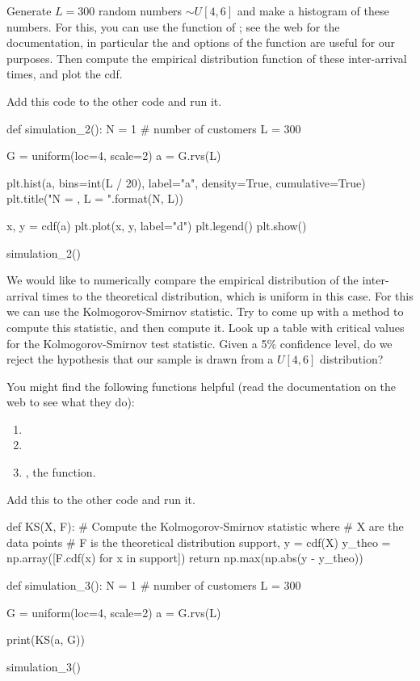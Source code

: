 \begin{exercise}
  Generate $L=300$ random numbers $\sim U[4,6]$ and make a histogram of these numbers.
  For this, you can use the  function of ; see the web for the documentation, in particular the  and  options of the  function are useful for our purposes.
  Then compute the empirical distribution function of these inter-arrival times, and plot the cdf.
\begin{solution}
Add this code to the other code and run it.
\begin{pyverbatim}
def simulation_2():
    N = 1  # number of customers
    L = 300

    G = uniform(loc=4, scale=2)
    a = G.rvs(L)

    plt.hist(a, bins=int(L / 20), label="a", density=True, cumulative=True)
    plt.title("N = {}, L = {}".format(N, L))

    x, y = cdf(a)
    plt.plot(x, y, label="d")
    plt.legend()
    plt.show()

simulation_2()
\end{pyverbatim}
\end{solution}
\end{exercise}

\begin{exercise}
We would like to numerically compare the empirical distribution of the inter-arrival times to the theoretical distribution, which is uniform in this case.
For this we can use the Kolmogorov-Smirnov statistic. Try to come up with a method to compute this statistic, and then compute it.
Look up a table with critical values for the Kolmogorov-Smirnov test statistic.
Given a 5\% confidence level, do we reject the hypothesis that our sample is drawn from a $U[4,6]$ distribution?

You might find the following functions helpful (read the documentation on the web to see what they do):
\begin{enumerate}
\item {}
\item {}
\item {}, the  function.
\end{enumerate}

\begin{solution}
Add this to the other code and run it.
\begin{pyverbatim}
def KS(X, F):
    # Compute the Kolmogorov-Smirnov statistic where
    # X are the data points
    # F is the theoretical distribution
    support, y = cdf(X)
    y_theo = np.array([F.cdf(x) for x in support])
    return np.max(np.abs(y - y_theo))

def simulation_3():
    N = 1  # number of customers
    L = 300

    G = uniform(loc=4, scale=2)
    a = G.rvs(L)

    print(KS(a, G))

simulation_3()
\end{pyverbatim}
\end{solution}
\end{exercise}

